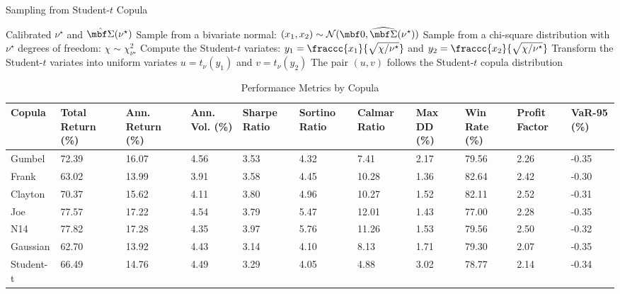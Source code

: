 \documentclass[12pt,a4paper]{article}
\begin{document}
\begin{algorithm}[H]
\label{alg:sampling_student-t}
\caption{Sampling from Student-$t$ Copula}
\begin{algorithmic}[1]
\Require Calibrated $\nu^\star$ and $\hat{\mbf \Sigma}(\nu^\star)$ %
\State Sample from a bivariate normal: $\displaystyle (x_1, x_2) \sim \mathcal{N}(\mbf 0, \widehat{\mbf \Sigma}(\nu^{\star}))$ 
\State Sample from a chi-square distribution with $\nu^\star$ degrees of freedom: $\displaystyle \chi \sim \chi^2_{\nu^\star}$
\State Compute the Student-$t$ variates: $y_1 = \fraccc{x_1}{\sqrt{\chi/\nu^{\star}}}$ and $y_2 = \fraccc{x_2}{\sqrt{\chi/\nu^{\star}}}$
\State Transform the Student-$t$ variates into uniform variates %
$u = t_{\nu}(y_1)$ and $v = t_{\nu}(y_2)$ 
\Ensure The pair $(u,v)$ follows the Student-$t$ copula distribution
\end{algorithmic}
\end{algorithm}


\begin{table}[H]
\centering
\caption{Performance Metrics by Copula}
\label{tab:copula_performance}
\small\begin{tabular}{lR{1.2cm}R{1.2cm}R{1.1cm}R{1.3cm}R{1.3cm}R{1.3cm}R{1.2cm}R{1.2cm}R{1.2cm}R{1.3cm}}
\toprule
Copula & Total Return (\%) & Ann. Return (\%) & Ann. Vol. (\%) & Sharpe Ratio & Sortino Ratio & Calmar Ratio & Max DD (\%) & Win Rate (\%) & Profit Factor & VaR-95 (\%) \\
\midrule
Gumbel & 72.39 & 16.07 & 4.56 & 3.53 & 4.32 & 7.41 & 2.17 & 79.56 & 2.26 & -0.35 \\
Frank & 63.02 & 13.99 & 3.91 & 3.58 & 4.45 & 10.28 & 1.36 & 82.64 & 2.42 & -0.30 \\
Clayton & 70.37 & 15.62 & 4.11 & 3.80 & 4.96 & 10.27 & 1.52 & 82.11 & 2.52 & -0.31 \\
Joe & 77.57 & 17.22 & 4.54 & 3.79 & 5.47 & 12.01 & 1.43 & 77.00 & 2.28 & -0.35 \\
N14 & 77.82 & 17.28 & 4.35 & 3.97 & 5.76 & 11.26 & 1.53 & 79.56 & 2.50 & -0.32 \\
Gaussian & 62.70 & 13.92 & 4.43 & 3.14 & 4.10 & 8.13 & 1.71 & 79.30 & 2.07 & -0.35 \\
Student-t & 66.49 & 14.76 & 4.49 & 3.29 & 4.05 & 4.88 & 3.02 & 78.77 & 2.14 & -0.34 \\
\bottomrule
\end{tabular}
\end{table}
\end{document}
